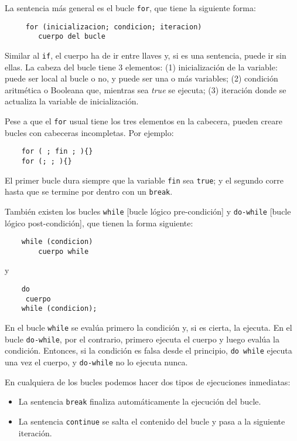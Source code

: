\documentclass[a4paper]{article}
\begin{document}
	 La sentencia más general es el bucle \verb|for|, que tiene la siguiente forma:
	 \begin{lstlisting}
	 for (inicializacion; condicion; iteracion)
	 	cuerpo del bucle
	 \end{lstlisting}
	
	Similar al \verb|if|, el cuerpo ha de ir entre llaves y, si es una sentencia, puede ir sin ellas. La cabeza del bucle tiene 3 elementos: (1) inicialización de la variable: puede ser local al bucle o no, y puede ser una o más variables; (2) condición aritmética o Booleana que, mientras sea \textit{true} se ejecuta; (3) iteración donde se actualiza la variable de inicialización.
	
	Pese a que el \verb|for| usual tiene los tres elementos en la cabecera, pueden creare bucles con cabeceras incompletas. Por ejemplo:
	\begin{lstlisting}
	for ( ; fin ; ){}
	for (; ; ){}
	\end{lstlisting}
	El primer bucle dura siempre que la variable \verb|fin| sea \verb|true|; y el segundo corre hasta que se termine por dentro con un \verb|break|.
	
	También existen los bucles \verb|while| [bucle lógico pre-condición] y \verb|do-while| [bucle lógico post-condición], que tienen la forma siguiente:
	\begin{lstlisting}
	while (condicion)
		cuerpo while
	\end{lstlisting}
	
	y 
	\begin{lstlisting}
	do
	 cuerpo
	while (condicion);
	\end{lstlisting}	
	
	En el bucle \verb|while| se evalúa primero la condición y, si es cierta, la ejecuta. En el bucle \verb|do-while|, por el contrario, primero ejecuta el cuerpo y luego evalúa la condición. Entonces, si la condición es falsa desde el principio, \verb|do while| ejecuta una vez el cuerpo, y \verb|do-while| no lo ejecuta nunca.
	
	En cualquiera de los bucles podemos hacer dos tipos de ejecuciones inmediatas:
	\begin{itemize}
		\item La sentencia \verb|break| finaliza automáticamente la ejecución del bucle.
		\item La sentencia \verb|continue| se salta el contenido del bucle y pasa a la siguiente iteración.
	\end{itemize}
	
\end{document}
